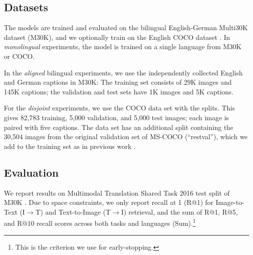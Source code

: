 \subsection{Datasets}

The models are trained and evaluated on the bilingual English-German Multi30K dataset (M30K), and we
optionally train on the English COCO dataset 
\citep{Chen2015}. In \textit{monolingual} 
experiments, the model is trained on a single language from M30K or 
COCO.

In the \emph{aligned} bilingual experiments, we use the
independently collected English and German captions in M30K:
The training set consists of 29K images and 145K captions; the validation and test sets have 1K images and 5K captions. 

For the \emph{disjoint} experiments, we use the COCO data set
with the \citep{karpathy2015deep} splits. This gives 82,783 training,
5,000 validation, and 5,000 test images; each image is paired with five captions.
The data set has an additional split containing the  
30,504 images from the original validation set of 
MS-COCO (``restval''),
 which we add to the training set as in previous work \citep{karpathy2015deep,vendrov2016order,faghri2017vse++}.
 


\subsection{Evaluation}
We report results on Multimodal Translation Shared Task 2016 test split of M30K \citep{Specia2016}. 
Due to space constraints, we only report recall at 1 (R@1) for 
Image-to-Text (I$\rightarrow$T) and Text-to-Image (T$\rightarrow$I)
retrieval, and the sum of R@1, R@5, and R@10 recall scores across both tasks and languages (Sum).\footnote{This is the criterion we use
for early-stopping.}

